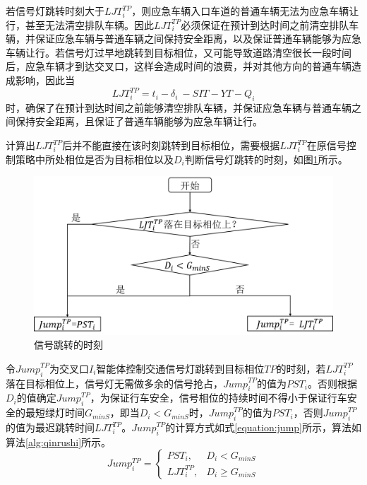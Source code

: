 若信号灯跳转时刻大于${{LJT}_i^{TP}}$，则应急车辆入口车道的普通车辆无法为应急车辆让行，甚至无法清空排队车辆。因此${{LJT}_i^{TP}}$必须保证在预计到达时间之前清空排队车辆，并保证应急车辆与普通车辆之间保持安全距离，以及保证普通车辆能够为应急车辆让行。若信号灯过早地跳转到目标相位，又可能导致道路清空很长一段时间后，应急车辆才到达交叉口，这样会造成时间的浪费，并对其他方向的普通车辆造成影响，因此当
\begin{equation}
	\label{equation:D_i}
	{LJT}_i^{TP}=t_i-\delta_i\ -SIT-YT-Q_i
\end{equation}
时，确保了在预计到达时间之前能够清空排队车辆，并保证应急车辆与普通车辆之间保持安全距离，且保证了普通车辆能够为应急车辆让行。

计算出${{LJT}_i^{TP}}$后并不能直接在该时刻跳转到目标相位，需要根据${{LJT}_i^{TP}}$在原信号控制策略中所处相位是否为目标相位以及${D_i}$判断信号灯跳转的时刻，如图\ref{fig:jump_time}所示。
\begin{figure}[ht]
	\centering
	\includegraphics[width=\textwidth]{figures/jump_time.png}
	\caption{信号跳转的时刻}
	\label{fig:jump_time}
\end{figure}

令${{Jump}_i^{TP}}$为交叉口${I_i}$智能体控制交通信号灯跳转到目标相位${TP}$的时刻，若${{LJT}_i^{TP}}$落在目标相位上，信号灯无需做多余的信号抢占，${{Jump}_i^{TP}}$的值为${PST_i}$。否则根据${D_i}$的值确定${{Jump}_i^{TP}}$，为保证行车安全，信号相位的持续时间不得小于保证行车安全的最短绿灯时间${G_{minS}}$，即当${D_i<G_{minS}}$时，${{Jump}_i^{TP}}$的值为${PST_i}$，否则${{Jump}_i^{TP}}$的值为最迟跳转时间${{LJT}_i^{TP}}$。${{Jump}_i^{TP}}$的计算方式如式\ref{equation:jump}所示，算法如算法\ref{alg:qinrushi}所示。
\begin{equation}
	Jump_{i}^{TP}=
	\begin{cases}
		PST_{i}, & D_{i}<G_{minS} \\
		LJT_{i}^{TP}, & D_{i}\geqslant G_{minS}
	\end{cases}
	\label{equation:jump}
\end{equation}


